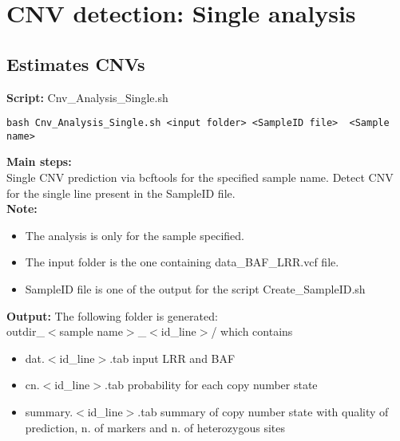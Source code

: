 \documentclass[11pt]{paper}
\begin{document}
\section{CNV detection: Single analysis}
\subsection{Estimates CNVs}
\textbf{Script:} Cnv\_Analysis\_Single.sh
\begin{verbatim}
bash Cnv_Analysis_Single.sh <input folder> <SampleID file>  <Sample name> 
\end{verbatim}
\textbf{Main steps:}\\
Single CNV prediction via bcftools for the specified sample name. Detect CNV for the single line present in the SampleID file.\\
\textbf{Note:}
\vspace{-0.2cm}
\begin{itemize}
\item The analysis is only for the sample specified.
\item The input folder is the one containing data\_BAF\_LRR.vcf file.
\item SampleID file is one of the output for the script Create\_SampleID.sh
\end{itemize}
\textbf{Output:}
The following folder is generated:\\
outdir\_$<$sample name$>$\_$<$id\_line$>$/ which contains
\begin{itemize}
\item dat.$<$id\_line$>$.tab input LRR and BAF
\item cn.$<$id\_line$>$.tab probability for each copy number state
\item summary.$<$id\_line$>$.tab summary of copy number state with quality of prediction, n. of markers and n. of heterozygous sites 
\end{itemize}
\end{document}
